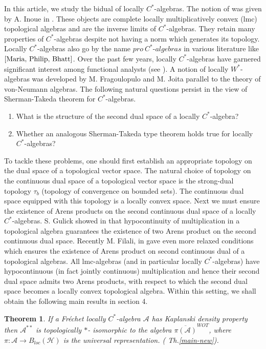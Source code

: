 \documentclass[10pt]{article}
\newtheorem{theorem}{Theorem}[section]
\theoremstyle{definition}
\begin{document}
	In this article, we study the bidual of locally $C^*$-algebras. The notion of  was given by A. Inoue in \cite{Inoue}. These objects are complete locally multiplicatively convex (lmc) topological algebras and are the inverse limits of $C^*$-algebras. They retain many properties of $C^*$-algebras despite not having a norm which generates its topology. Locally $C^*$-algebras also go by the name $pro~C^*\text{-}algebras$ in various literature like $\cite{Maria, Philip, Bhatt}$. Over the past few years, locally $C^*$-algebras have garnered significant interest among functional analysts (see \cite{Gheondea}). A notion of locally $W^*$-algebras was developed by M. Fragoulopulo\cite{Maria} and M. Joita\cite{Joita} parallel to the theory of von-Neumann algebras. The following natural questions persist in the view of Sherman-Takeda theorem for $C^*$-algebras.
	\begin{enumerate}[noitemsep] \item What is the structure of the second dual space of a locally $C^*$-algebra? \item Whether an analogous Sherman-Takeda type theorem holds true for locally $C^*$-algebras?
	\end{enumerate}
	To tackle these problems, one should first establish an appropriate topology on the dual space of a topological vector space. The natural choice of topology on the continuous dual space of a topological vector space is the strong-dual topology $\tau_b$ (topology of convergence on  bounded sets). The continuous dual space equipped with this topology is a locally convex space. Next we must ensure the existence of Arens products on the second continuous dual space of a locally $C^*$-algebras. S. Gulick showed in \cite{Gulick} that hypocontinuity of multiplication in a topological algebra guarantees the existence of two Arens product on the second continuous dual space. Recently M. Filali, in \cite{Filali} gave even more relaxed conditions which ensures the existence of Arens product on second continuous dual of a topological algebras. All lmc-algebras (and in particular locally $C^*$-algebras) have hypocontinuous (in fact jointly continuous) multiplication and hence their second dual space admits two Arens products, with respect to which the second dual space becomes  a locally convex topological algebra. Within this setting, we shall obtain the following main results in section 4. 
	\begin{theorem}
		If a Fr\'echet locally $C^*$-algebra $\mathcal A$ has Kaplanski density property then $\mathcal A^{**}$ is topologically $*$- isomorphic to the algebra $\overline{\pi(\mathcal A)}^{WOT}$, where $\pi:\mathcal A\to B_{loc}(\mathcal H)$ is the universal representation. ( Th.\ref{main-new}).
	\end{theorem}
	
\end{document}
